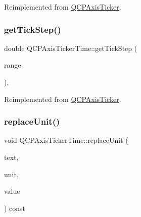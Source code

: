 Reimplemented from \hyperlink{class_q_c_p_axis_ticker_a8201eb4aa8be192bf786b126eb5ee089}{Q\+C\+P\+Axis\+Ticker}.

\mbox{\label{class_q_c_p_axis_ticker_time_a5615064642090fe193797caea8b98cb4}} 
\subsubsection{\texorpdfstring{get\+Tick\+Step()}{getTickStep()}}
{\footnotesize\ttfamily double Q\+C\+P\+Axis\+Ticker\+Time\+::get\+Tick\+Step (\begin{DoxyParamCaption}\item[{const \hyperlink{class_q_c_p_range}{Q\+C\+P\+Range} \&}]{range }\end{DoxyParamCaption})\hspace{0.3cm}{\ttfamily [protected]}, {\ttfamily [virtual]}}



Reimplemented from \hyperlink{class_q_c_p_axis_ticker_a910d69bcec2de37e92d8d4e1ecf201e2}{Q\+C\+P\+Axis\+Ticker}.

\mbox{\label{class_q_c_p_axis_ticker_time_a03b6c980be36f2672e3fc31d109a28a0}} 
\subsubsection{\texorpdfstring{replace\+Unit()}{replaceUnit()}}
{\footnotesize\ttfamily void Q\+C\+P\+Axis\+Ticker\+Time\+::replace\+Unit (\begin{DoxyParamCaption}\item[{Q\+String \&}]{text,  }\item[{\hyperlink{class_q_c_p_axis_ticker_time_a5c48ded8c6d3a1aca9b68219469fea3e}{Q\+C\+P\+Axis\+Ticker\+Time\+::\+Time\+Unit}}]{unit,  }\item[{int}]{value }\end{DoxyParamCaption}) const\hspace{0.3cm}{\ttfamily [protected]}}

\mbox{\label{class_q_c_p_axis_ticker_time_adc13e54fc969be98a5c0e3fa0dbaa293}} 
